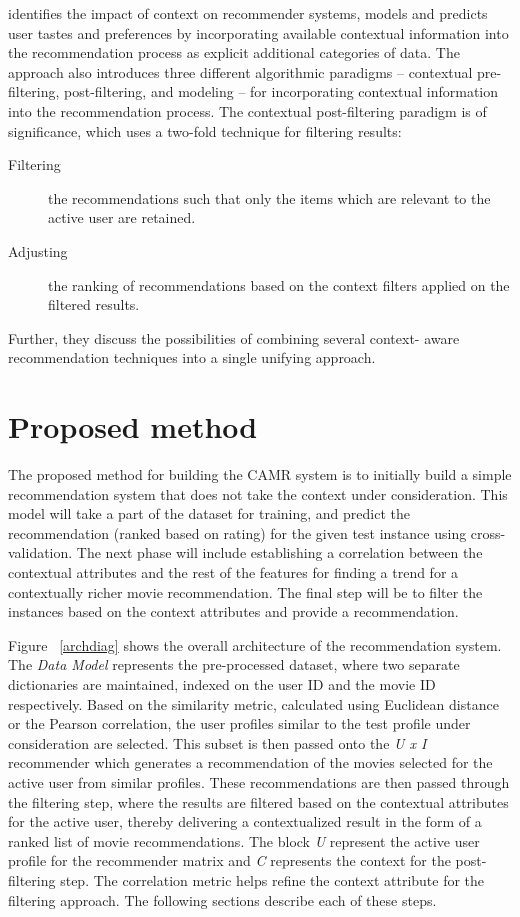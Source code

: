 \documentclass{article}
\begin{document}
\cite{adomavicius2011context} identifies the impact of context on recommender systems, models and predicts user tastes and preferences by incorporating available contextual information into the recommendation process as explicit additional categories of data. The approach also introduces three different algorithmic paradigms – contextual pre-
filtering, post-filtering, and modeling – for incorporating contextual information into the recommendation process. The contextual post-filtering paradigm is of significance, which uses a two-fold technique for filtering results:
\begin{description}
\item[Filtering] the recommendations such that only the items which are relevant to the active user are retained.
\item[Adjusting] the ranking of recommendations based on the context filters applied on the filtered results.
\end{description}
Further, they discuss the possibilities of combining several context- aware recommendation techniques into a single unifying approach.

\section{Proposed method}
The proposed method for building the CAMR system is to initially build a simple recommendation system that does not take the context under consideration. This model will take a part of the dataset for training, and predict the recommendation (ranked based on rating) for the given test instance using cross-validation. The next phase will include establishing a correlation between the contextual attributes and the rest of the features for finding a trend for a contextually richer movie recommendation. The final step will be to filter the instances based on the context attributes and provide a recommendation. 

Figure ~\ref{archdiag} shows the overall architecture of the recommendation system. The \textit{Data Model} represents the pre-processed dataset, where two separate dictionaries are maintained, indexed on the user ID and the movie ID respectively. Based on the similarity metric, calculated using Euclidean distance or the Pearson correlation, the user profiles similar to the test profile under consideration are selected. This subset is then passed onto the \textit{U x I} recommender which generates a recommendation of the movies selected for the active user from similar profiles. These recommendations are then passed through the filtering step, where the results are filtered based on the contextual attributes for the active user, thereby delivering a contextualized result in the form of a ranked list of movie recommendations. The block \textit{U} represent the active user profile for the recommender matrix and \textit{C} represents the context for the post-filtering step. The correlation metric helps refine the context attribute for the filtering approach. The following sections describe each of these steps.
\end{document}
